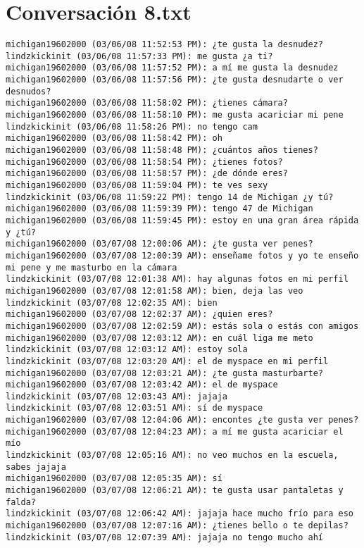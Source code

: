 \section{Conversaci\'on 8.txt}

\begin{verbatim}
michigan19602000 (03/06/08 11:52:53 PM): ¿te gusta la desnudez?
lindzkickinit (03/06/08 11:57:33 PM): me gusta ¿a ti?
michigan19602000 (03/06/08 11:57:52 PM): a mí me gusta la desnudez
michigan19602000 (03/06/08 11:57:56 PM): ¿te gusta desnudarte o ver desnudos?
michigan19602000 (03/06/08 11:58:02 PM): ¿tienes cámara?
michigan19602000 (03/06/08 11:58:10 PM): me gusta acariciar mi pene
lindzkickinit (03/06/08 11:58:26 PM): no tengo cam
michigan19602000 (03/06/08 11:58:42 PM): oh 
michigan19602000 (03/06/08 11:58:48 PM): ¿cuántos años tienes?
michigan19602000 (03/06/08 11:58:54 PM): ¿tienes fotos?
michigan19602000 (03/06/08 11:58:57 PM): ¿de dónde eres?
michigan19602000 (03/06/08 11:59:04 PM): te ves sexy
lindzkickinit (03/06/08 11:59:22 PM): tengo 14 de Michigan ¿y tú?
michigan19602000 (03/06/08 11:59:39 PM): tengo 47 de Michigan
michigan19602000 (03/06/08 11:59:45 PM): estoy en una gran área rápida y ¿tú?
michigan19602000 (03/07/08 12:00:06 AM): ¿te gusta ver penes?
michigan19602000 (03/07/08 12:00:39 AM): enseñame fotos y yo te enseño mi pene y me masturbo en la cámara
lindzkickinit (03/07/08 12:01:38 AM): hay algunas fotos en mi perfil
michigan19602000 (03/07/08 12:01:58 AM): bien, deja las veo
lindzkickinit (03/07/08 12:02:35 AM): bien
michigan19602000 (03/07/08 12:02:37 AM): ¿quien eres?
michigan19602000 (03/07/08 12:02:59 AM): estás sola o estás con amigos
michigan19602000 (03/07/08 12:03:12 AM): en cuál liga me meto
lindzkickinit (03/07/08 12:03:12 AM): estoy sola
lindzkickinit (03/07/08 12:03:20 AM): el de myspace en mi perfil
michigan19602000 (03/07/08 12:03:21 AM): ¿te gusta masturbarte?
michigan19602000 (03/07/08 12:03:42 AM): el de myspace
lindzkickinit (03/07/08 12:03:43 AM): jajaja 
lindzkickinit (03/07/08 12:03:51 AM): sí de myspace
michigan19602000 (03/07/08 12:04:06 AM): encontes ¿te gusta ver penes?
michigan19602000 (03/07/08 12:04:23 AM): a mí me gusta acariciar el mío
lindzkickinit (03/07/08 12:05:16 AM): no veo muchos en la escuela, sabes jajaja
michigan19602000 (03/07/08 12:05:35 AM): sí
michigan19602000 (03/07/08 12:06:21 AM): te gusta usar pantaletas y falda?
lindzkickinit (03/07/08 12:06:42 AM): jajaja hace mucho frío para eso
michigan19602000 (03/07/08 12:07:16 AM): ¿tienes bello o te depilas?
lindzkickinit (03/07/08 12:07:39 AM): jajaja no tengo mucho ahí

\end{verbatim}
